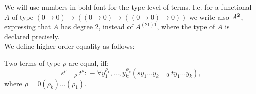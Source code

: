 We will use numbers in bold font for the type level of terms. I.e. for
a functional $A$ of type 
$(0\rightarrow 0) \rightarrow ( (0\rightarrow 0)\rightarrow((0\rightarrow 0)\rightarrow 0) ) $
we write also $A^\mathbf{2}$, expressing that $A$ has degree $2$, 
instead of $A^{(21)1}$, where the type of $A$ is declared precisely.\\                                                         
%
We define higher order equality as follows:
\begin{dfn}\label{l:hte}
Two terms of type $\rho$ are equal, iff:
                        \[
         s^{\rho} =_{\rho} t^{\rho} : \equiv \forall y_{1}^{\rho_{1}},
         \dots, y_{k}^{\rho_{k}}(sy_{1} \dots y_{k} =_{0} ty_{1} \dots y_{k})\text{,}
                        \]
where $\rho = 0(\rho_{k})\dots (\rho_{1})$.
\end{dfn}

